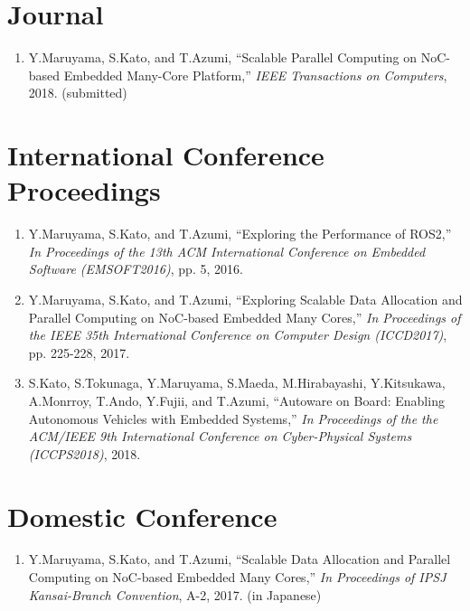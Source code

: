 \documentclass[a4j,12pt,oneside,openany,english]{jsbook}
\begin{document}
\renewcommand{\labelenumi}{[\arabic{enumi}]}

\section*{Journal}
\begin{enumerate}
\item Y.Maruyama, S.Kato, and T.Azumi,
  ``{Scalable Parallel Computing on NoC-based Embedded Many-Core Platform},''
  \emph{IEEE Transactions on Computers}, 2018.
  (submitted)
\end{enumerate}

\section*{International Conference Proceedings}
\begin{enumerate}
\item Y.Maruyama, S.Kato, and T.Azumi,
  ``{Exploring the Performance of ROS2},''
  \emph{In Proceedings of the 13th ACM International Conference on Embedded Software (EMSOFT2016)}, pp. 5, 2016.
\item Y.Maruyama, S.Kato, and T.Azumi,
  ``{Exploring Scalable Data Allocation and Parallel Computing on NoC-based Embedded Many Cores},''
  \emph{In Proceedings of the IEEE 35th International Conference on Computer Design (ICCD2017)}, pp. 225-228, 2017.
\item S.Kato, S.Tokunaga, Y.Maruyama, S.Maeda, M.Hirabayashi, Y.Kitsukawa, A.Monrroy, T.Ando, Y.Fujii, and T.Azumi,
  ``{Autoware on Board: Enabling Autonomous Vehicles with Embedded Systems},''
  \emph{In Proceedings of the the ACM/IEEE 9th International Conference on Cyber-Physical Systems (ICCPS2018)}, 2018.
\end{enumerate}

\section*{Domestic Conference}
\begin{enumerate}
\item Y.Maruyama, S.Kato, and T.Azumi,
  ``{Scalable Data Allocation and Parallel Computing on NoC-based Embedded Many Cores},''
  \emph{In Proceedings of IPSJ Kansai-Branch Convention}, A-2, 2017.
  (in Japanese)
\end{enumerate}
\end{document}
